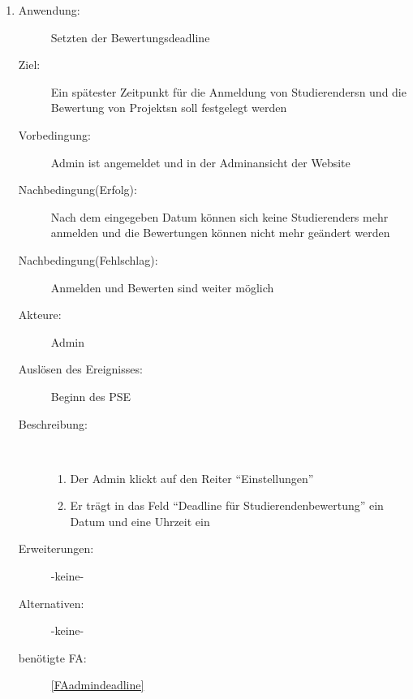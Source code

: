 \documentclass[parskip=full]{scrartcl}
\newcommand{\swtLabel}[1]{\textbf{/#1\arabic*0/}}
\begin{document}
\begin{enumerate} [label=\swtLabel{A}]
	
	\item
	\begin{description}
		\item[Anwendung:] Setzten der Bewertungsdeadline
		\item[Ziel:] Ein spätester Zeitpunkt für die Anmeldung von \glspl{Studierender}n und die Bewertung von \glspl{Projekt}n soll festgelegt werden
		\item[Vorbedingung:] \gls{Admin} ist angemeldet und in der Adminansicht der Website
		\item[Nachbedingung(Erfolg):] Nach dem eingegeben Datum können sich keine \glspl{Studierender} mehr anmelden und die Bewertungen können nicht mehr geändert werden
		\item[Nachbedingung(Fehlschlag):] Anmelden und Bewerten sind weiter möglich
		\item[Akteure:] \gls{Admin}
		\item[Auslösen des Ereignisses:] Beginn des \gls{PSE}
		\item[Beschreibung:]~
		\begin{enumerate}[label=\arabic*.]
			\item Der \gls{Admin} klickt auf den Reiter \enquote{Einstellungen}
			\item Er trägt in das Feld \enquote{Deadline für Studierendenbewertung} ein Datum und eine Uhrzeit ein
		\end{enumerate}
		\item[Erweiterungen:] -keine-
		\item[Alternativen:] -keine-
		\item[benötigte FA:] \ref{FAadmindeadline}
	\end{description}
	

\end{enumerate}
\end{document}

